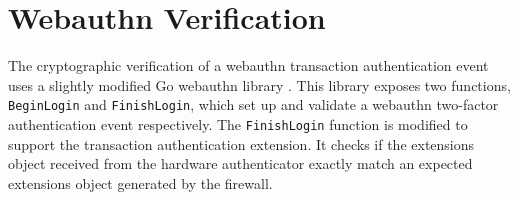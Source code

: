 




\section{Webauthn Verification}\label{Sec:WebauthnVerification}

The cryptographic verification of a webauthn transaction authentication event uses a slightly modified Go webauthn library \cite{TODO-Golang-Webauthn-Library}. This library exposes two functions, \lstinline{BeginLogin} and \lstinline{FinishLogin}, which set up and validate a webauthn two-factor authentication event respectively. The \lstinline{FinishLogin} function is modified to support the transaction authentication extension. It checks if the extensions object received from the hardware authenticator exactly match an expected extensions object generated by the firewall.


